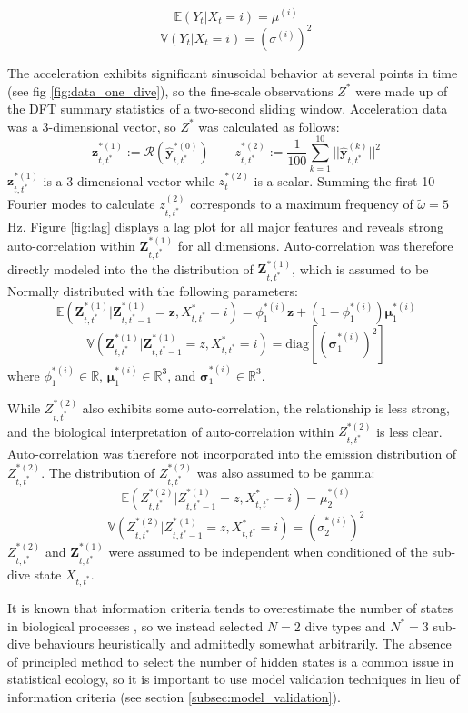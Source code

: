 $$\mathbb{E}(Y_t|X_t = i) = \mu^{(i)}$$
$$\mathbb{V}(Y_t|X_t = i) = \left(\sigma^{(i)}\right)^2$$

The acceleration exhibits significant sinusoidal behavior at several points in time (see fig \ref{fig:data_one_dive}), so the fine-scale observations $Z^*$ were made up of the DFT summary statistics of a two-second sliding window. Acceleration data was a 3-dimensional vector, so $Z^*$ was calculated as follows:
%
$$\mathbf{z}_{t,t^*}^{*(1)} := \mathcal{R}\left(\hat{\mathbf{y}}^{*(0)}_{t,t^*}\right) \qquad z_{t,t^*}^{*(2)} := \frac{1}{100}\sum_{k=1}^{10}||\hat{\mathbf{y}}^{(k)}_{t,t^*}||^2$$
%
$\mathbf{z}_{t,t^*}^{*(1)}$ is a 3-dimensional vector while $z_t^{*(2)}$ is a scalar. Summing the first 10 Fourier modes to calculate $z^{(2)}_{t,t^*}$ corresponds to a maximum frequency of $\tilde \omega = 5$ Hz. Figure \ref{fig:lag} displays a lag plot for all major features and reveals strong auto-correlation within $\mathbf{Z}^{*(1)}_{t,t^*}$ for all dimensions. Auto-correlation was therefore directly modeled into the the distribution of $\mathbf{Z}^{*(1)}_{t,t^*}$, which is assumed to be Normally distributed with the following parameters:
%
$$\mathbb{E}(\mathbf{Z}^{*(1)}_{t,t^*}|\mathbf{Z}^{*(1)}_{t,t^*-1} = \mathbf{z}, X^*_{t,t^*} = i) = \phi_1^{*(i)} \mathbf{z} + (1-\phi_1^{*(i)}) \mathbf{\mu}_1^{*(i)}$$
$$\mathbb{V}(\mathbf{Z}^{*(1)}_{t,t^*}|\mathbf{Z}^{*(1)}_{t,t^*-1} = z,X^*_{t,t^*} = i) = \text{diag}\left[\left(\mathbf{\sigma}_1^{*(i)}\right)^2\right]$$
%
where $\phi_1^{*(i)} \in \mathbb{R}$, $\mathbf{\mu}_1^{*(i)} \in \mathbb{R}^3$, and $\mathbf{\sigma}_1^{*(i)} \in \mathbb{R}^3$.

While $Z^{*(2)}_{t,t^*}$ also exhibits some auto-correlation, the relationship is less strong, and the biological interpretation of auto-correlation within $Z^{*(2)}_{t,t^*}$ is less clear. Auto-correlation was therefore not incorporated into the emission distribution of $Z^{*(2)}_{t,t^*}$. The distribution of $Z^{*(2)}_{t,t^*}$ was also assumed to be gamma:
%
$$\mathbb{E}(Z^{*(2)}_{t,t^*}|Z^{*(1)}_{t,t^*-1} = z,X^*_{t,t^*} = i) = \mu_2^{*(i)}$$
$$\mathbb{V}(Z^{*(2)}_{t,t^*}|Z^{*(1)}_{t,t^*-1} = z,X^*_{t,t^*} = i) = \left(\sigma_2^{*(i)}\right)^2$$
%
$Z^{*(2)}_{t,t^*}$ and $\mathbf{Z}^{*(1)}_{t,t^*}$ were assumed to be independent when conditioned of the sub-dive state $X_{t,t^*}$.

It is known that information criteria tends to overestimate the number of states in biological processes \citep{Pohle:2017}, so we instead selected $N = 2$ dive types and $N^* = 3$ sub-dive behaviours heuristically and admittedly somewhat arbitrarily. The absence of principled method to select the number of hidden states is a common issue in statistical ecology, so it is important to use model validation techniques in lieu of information criteria (see section \ref{subsec:model_validation}).

